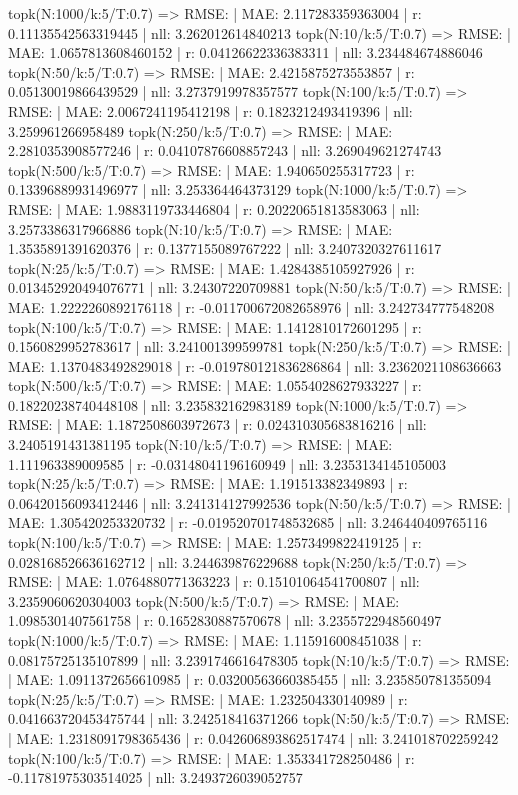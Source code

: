 topk(N:1000/k:5/T:0.7) => RMSE: | MAE: 2.117283359363004 | r: 0.11135542563319445 | nll: 3.262012614840213
topk(N:10/k:5/T:0.7) => RMSE: | MAE: 1.0657813608460152 | r: 0.04126622336383311 | nll: 3.234484674886046
topk(N:50/k:5/T:0.7) => RMSE: | MAE: 2.4215875273553857 | r: 0.05130019866439529 | nll: 3.2737919978357577
topk(N:100/k:5/T:0.7) => RMSE: | MAE: 2.0067241195412198 | r: 0.1823212493419396 | nll: 3.259961266958489
topk(N:250/k:5/T:0.7) => RMSE: | MAE: 2.2810353908577246 | r: 0.04107876608857243 | nll: 3.269049621274743
topk(N:500/k:5/T:0.7) => RMSE: | MAE: 1.940650255317723 | r: 0.13396889931496977 | nll: 3.253364464373129
topk(N:1000/k:5/T:0.7) => RMSE: | MAE: 1.9883119733446804 | r: 0.20220651813583063 | nll: 3.2573386317966886
topk(N:10/k:5/T:0.7) => RMSE: | MAE: 1.3535891391620376 | r: 0.1377155089767222 | nll: 3.2407320327611617
topk(N:25/k:5/T:0.7) => RMSE: | MAE: 1.4284385105927926 | r: 0.013452920494076771 | nll: 3.24307220709881
topk(N:50/k:5/T:0.7) => RMSE: | MAE: 1.2222260892176118 | r: -0.011700672082658976 | nll: 3.242734777548208
topk(N:100/k:5/T:0.7) => RMSE: | MAE: 1.1412810172601295 | r: 0.1560829952783617 | nll: 3.241001399599781
topk(N:250/k:5/T:0.7) => RMSE: | MAE: 1.1370483492829018 | r: -0.019780121836286864 | nll: 3.2362021108636663
topk(N:500/k:5/T:0.7) => RMSE: | MAE: 1.0554028627933227 | r: 0.18220238740448108 | nll: 3.235832162983189
topk(N:1000/k:5/T:0.7) => RMSE: | MAE: 1.1872508603972673 | r: 0.024310305683816216 | nll: 3.2405191431381195
topk(N:10/k:5/T:0.7) => RMSE: | MAE: 1.111963389009585 | r: -0.03148041196160949 | nll: 3.2353134145105003
topk(N:25/k:5/T:0.7) => RMSE: | MAE: 1.191513382349893 | r: 0.06420156093412446 | nll: 3.241314127992536
topk(N:50/k:5/T:0.7) => RMSE: | MAE: 1.305420253320732 | r: -0.019520701748532685 | nll: 3.246440409765116
topk(N:100/k:5/T:0.7) => RMSE: | MAE: 1.2573499822419125 | r: 0.028168526636162712 | nll: 3.244639876229688
topk(N:250/k:5/T:0.7) => RMSE: | MAE: 1.0764880771363223 | r: 0.15101064541700807 | nll: 3.2359060620304003
topk(N:500/k:5/T:0.7) => RMSE: | MAE: 1.0985301407561758 | r: 0.1652830887570678 | nll: 3.2355722948560497
topk(N:1000/k:5/T:0.7) => RMSE: | MAE: 1.115916008451038 | r: 0.08175725135107899 | nll: 3.2391746616478305
topk(N:10/k:5/T:0.7) => RMSE: | MAE: 1.0911372656610985 | r: 0.03200563660385455 | nll: 3.235850781355094
topk(N:25/k:5/T:0.7) => RMSE: | MAE: 1.232504330140989 | r: 0.041663720453475744 | nll: 3.242518416371266
topk(N:50/k:5/T:0.7) => RMSE: | MAE: 1.2318091798365436 | r: 0.042606893862517474 | nll: 3.241018702259242
topk(N:100/k:5/T:0.7) => RMSE: | MAE: 1.353341728250486 | r: -0.11781975303514025 | nll: 3.2493726039052757
